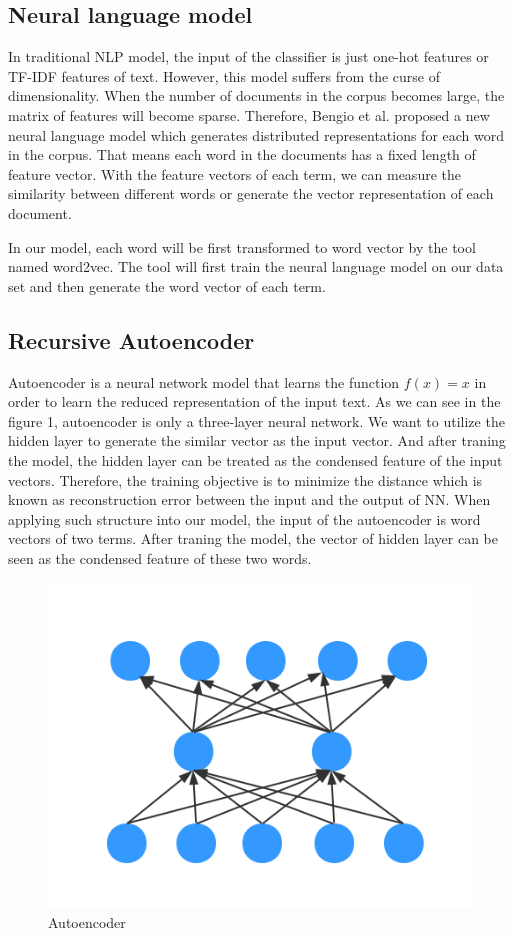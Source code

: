 \documentclass[dvips,12pt]{article}
\begin{document}
\subsection{Neural language model}
In traditional NLP model, the input of the classifier is just one-hot features or TF-IDF features of text. However, this model suffers from the curse of dimensionality. When the number of documents in the corpus becomes large, the matrix of features will become sparse. Therefore, Bengio et al.\cite{Bengio2003NLP} proposed a new neural language model which generates distributed representations for each word in the corpus. That means each word in the documents has a fixed length of feature vector. With the feature vectors of each term, we can measure the similarity between different words or generate the vector representation of each document.

In our model, each word will be first transformed to word vector by the tool named word2vec\cite{mikolov2013efficient}. The tool will first train the neural language model on our data set and then generate the word vector of each term.

\subsection{Recursive Autoencoder}
Autoencoder is a neural network model that learns the function $f(x)=x$ in order to learn the reduced representation of the input text. As we can see in the figure 1, autoencoder is only a three-layer neural network. We want to utilize the hidden layer to generate the similar vector as the input vector. And after traning the model, the hidden layer can be treated as the condensed feature of the input vectors. Therefore, the training objective is to minimize the distance which is known as reconstruction error between the input and the output of NN. When applying such structure into our model, the input of the autoencoder is word vectors of two terms. After traning the model, the vector of hidden layer can be seen as the condensed feature of these two words.

\begin{figure}[ht]
\centering
\includegraphics[width = 0.8\linewidth]{figure/autoencoder}
\caption{Autoencoder}
\label{fig:ae}
\end{figure}
\end{document}
